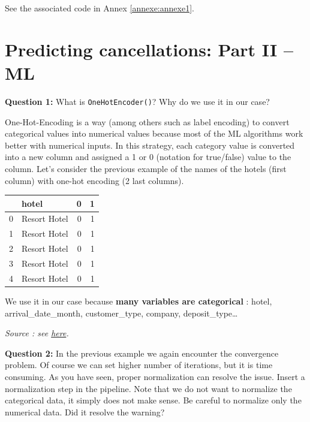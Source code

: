 \documentclass[10pt,a4paper]{article}
\theoremstyle{break}
\begin{document}
See the associated code in Annex \ref{annexe:annexe1}.

\hypertarget{predicting-cancellations-part-ii-ml}{%
\section{Predicting cancellations: Part II -- ML}\label{predicting-cancellations-part-ii-ml}}

\begin{tcolorbox}

\textbf{Question 1:} What is \texttt{OneHotEncoder()}? Why do we use it in our case?

\end{tcolorbox}

One-Hot-Encoding is a way (among others such as label encoding) to convert categorical values into numerical values because most of the ML algorithms work better with numerical inputs. In this strategy, each category value is converted into a new column and assigned a 1 or 0 (notation for true/false) value to the column. Let's consider the previous example of the names of the hotels (first column) with one-hot encoding (2 last columns).

\footnotesize

\begin{longtable}[]{@{}rlrr@{}}
\toprule
& hotel & 0 & 1\tabularnewline
\midrule
\endhead
0 & Resort Hotel & 0 & 1\tabularnewline
1 & Resort Hotel & 0 & 1\tabularnewline
2 & Resort Hotel & 0 & 1\tabularnewline
3 & Resort Hotel & 0 & 1\tabularnewline
4 & Resort Hotel & 0 & 1\tabularnewline
\bottomrule
\end{longtable}

\normalsize

We use it in our case because \textbf{many variables are categorical} : hotel, arrival\_date\_month, customer\_type, company, deposit\_type\dots

\emph{Source : see \href{https://towardsdatascience.com/categorical-encoding-using-label-encoding-and-one-hot-encoder-911ef77fb5bd}{here}.}

\begin{tcolorbox}

\textbf{Question 2:} In the previous example we again encounter the convergence problem. Of course we can set higher number of iterations, but it is time consuming. As you have seen, proper normalization can resolve the issue. Insert a normalization step in the pipeline. Note that we do not want to normalize the categorical data, it simply does not make sense. Be careful to normalize only the numerical data. Did it resolve the warning?

\end{tcolorbox}
\end{document}
